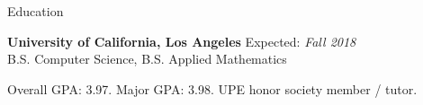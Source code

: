 \documentclass{resume} %
\begin{document}

\begin{rSection}{Education}

{\bf University of California, Los Angeles} \hfill {Expected: \em Fall 2018} \\ 
B.S. Computer Science, B.S. Applied Mathematics
\begin{rSubsection}{}{}{}{}
\item Overall GPA: 3.97. Major GPA: 3.98. UPE honor society member / tutor. 
\end{rSubsection}

\end{rSection}

\end{document}
